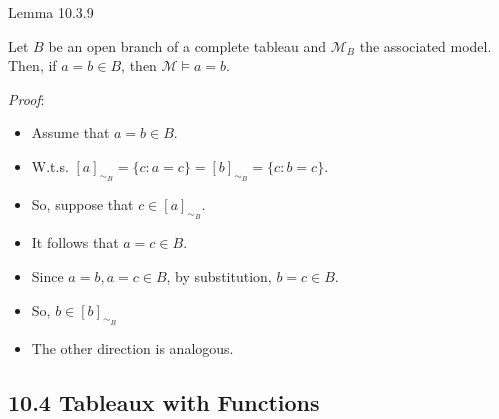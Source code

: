 \begin{frame}{Lemma 10.3.9}

Let $B$ be an open branch of a complete tableau and $\mathcal{M}_B$ the associated model. Then, if $a=b\in B$, then $\mathcal{M}\vDash a=b$.

\vspace{2ex}

\emph{Proof}:

\begin{itemize}

	\item Assume that $a=b\in B$.
	
	\item W.t.s. $[a]_{\sim_B}=\{c:a=c\}=[b]_{\sim_B}=\{c:b=c\}$.
	
	\item So, suppose that $c\in [a]_{\sim_B}$. 
	
	\item It follows that $a=c\in B$. 
	
	\item Since $a=b, a=c\in B$, by substitution, $b=c\in B$.
	
	\item So, $b\in [b]_{\sim_B}$
	
	\item The other direction is analogous.

\end{itemize}

\end{frame}

\subsection{10.4 Tableaux with Functions}

